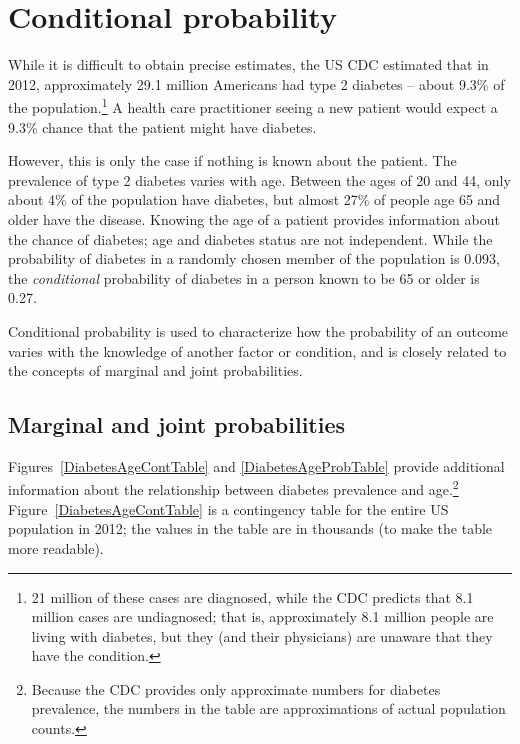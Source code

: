 \section{Conditional probability}
\label{conditionalProbabilitySection}

While it is difficult to obtain precise estimates, the US CDC estimated that in 2012, approximately 29.1 million Americans had type 2 diabetes -- about 9.3\% of the population.\footnote{21 million of these cases are diagnosed, while the CDC predicts that 8.1 million cases are undiagnosed; that is, approximately 8.1 million people are living with diabetes, but they (and their physicians) are unaware that they have the condition.} A health care practitioner seeing a new patient would expect a 9.3\% chance that the patient might have diabetes. 

However, this is only the case if nothing is known about the patient. The prevalence of type 2 diabetes varies with age. Between the ages of 20 and 44, only about 4\% of the population have diabetes, but almost 27\% of people age 65 and older have the disease. Knowing the age of a patient provides information about the chance of diabetes; age and diabetes status are not independent. While the probability of diabetes in a randomly chosen member of the population is 0.093, the \textit{conditional} probability of diabetes in a person known to be 65 or older is 0.27.

Conditional probability is used to  characterize how the probability of an outcome varies with the knowledge of another factor or condition, and is closely related to the concepts of marginal and joint probabilities.

\subsection{Marginal and joint probabilities}
\label{marginalAndJointProbabilities}



Figures~\ref{DiabetesAgeContTable} and \ref{DiabetesAgeProbTable} provide additional information about the relationship between diabetes prevalence and age.\footnote{Because the CDC provides only approximate numbers for diabetes prevalence, the numbers in the table are approximations of actual population counts.} Figure~\ref{DiabetesAgeContTable} is a contingency table for the entire US population in 2012; the values in the table are in thousands (to make the table more readable).  

